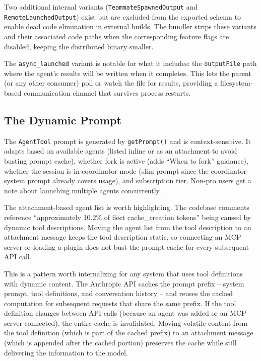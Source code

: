 \documentclass[
  english,
  11pt,
  letterpaper,
]{book}
\begin{document}
Two additional internal variants (\texttt{TeammateSpawnedOutput} and
\texttt{RemoteLaunchedOutput}) exist but are excluded from the exported
schema to enable dead code elimination in external builds. The bundler
strips these variants and their associated code paths when the
corresponding feature flags are disabled, keeping the distributed binary
smaller.

The \texttt{async\_launched} variant is notable for what it includes:
the \texttt{outputFile} path where the agent's results will be written
when it completes. This lets the parent (or any other consumer) poll or
watch the file for results, providing a filesystem-based communication
channel that survives process restarts.

\subsection{The Dynamic Prompt}\label{the-dynamic-prompt}

The \texttt{AgentTool} prompt is generated by \texttt{getPrompt()} and
is context-sensitive. It adapts based on available agents (listed inline
or as an attachment to avoid busting prompt cache), whether fork is
active (adds ``When to fork'' guidance), whether the session is in
coordinator mode (slim prompt since the coordinator system prompt
already covers usage), and subscription tier. Non-pro users get a note
about launching multiple agents concurrently.

The attachment-based agent list is worth highlighting. The codebase
comments reference ``approximately 10.2\% of fleet cache\_creation
tokens'' being caused by dynamic tool descriptions. Moving the agent
list from the tool description to an attachment message keeps the tool
description static, so connecting an MCP server or loading a plugin does
not bust the prompt cache for every subsequent API call.

This is a pattern worth internalizing for any system that uses tool
definitions with dynamic content. The Anthropic API caches the prompt
prefix -- system prompt, tool definitions, and conversation history --
and reuses the cached computation for subsequent requests that share the
same prefix. If the tool definition changes between API calls (because
an agent was added or an MCP server connected), the entire cache is
invalidated. Moving volatile content from the tool definition (which is
part of the cached prefix) to an attachment message (which is appended
after the cached portion) preserves the cache while still delivering the
information to the model.
\end{document}
